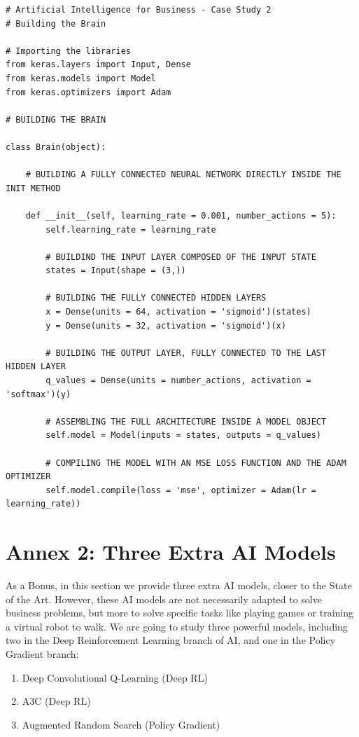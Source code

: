 \documentclass[]{book}
\begin{document}
\begin{lstlisting}
# Artificial Intelligence for Business - Case Study 2
# Building the Brain

# Importing the libraries
from keras.layers import Input, Dense
from keras.models import Model
from keras.optimizers import Adam

# BUILDING THE BRAIN

class Brain(object):
    
    # BUILDING A FULLY CONNECTED NEURAL NETWORK DIRECTLY INSIDE THE INIT METHOD
    
    def __init__(self, learning_rate = 0.001, number_actions = 5):
        self.learning_rate = learning_rate
        
        # BUILDIND THE INPUT LAYER COMPOSED OF THE INPUT STATE
        states = Input(shape = (3,))
        
        # BUILDING THE FULLY CONNECTED HIDDEN LAYERS
        x = Dense(units = 64, activation = 'sigmoid')(states)
        y = Dense(units = 32, activation = 'sigmoid')(x)
        
        # BUILDING THE OUTPUT LAYER, FULLY CONNECTED TO THE LAST HIDDEN LAYER
        q_values = Dense(units = number_actions, activation = 'softmax')(y)
        
        # ASSEMBLING THE FULL ARCHITECTURE INSIDE A MODEL OBJECT
        self.model = Model(inputs = states, outputs = q_values)
        
        # COMPILING THE MODEL WITH AN MSE LOSS FUNCTION AND THE ADAM OPTIMIZER
        self.model.compile(loss = 'mse', optimizer = Adam(lr = learning_rate))
\end{lstlisting}

\newpage

\section{Annex 2: Three Extra AI Models}

As a Bonus, in this section we provide three extra AI models, closer to the State of the Art. However, these AI models are not necessarily adapted to solve business problems, but more to solve specific tasks like playing games or training a virtual robot to walk. We are going to study three powerful models, including two in the Deep Reinforcement Learning branch of AI, and one in the Policy Gradient branch:

\begin{enumerate}
    \item Deep Convolutional Q-Learning (Deep RL)
    \item A3C (Deep RL)
    \item Augmented Random Search (Policy Gradient)
\end{enumerate}
\end{document}
